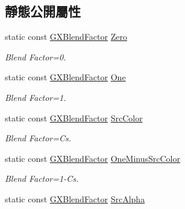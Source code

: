 \subsection*{靜態公開屬性}
\begin{DoxyCompactItemize}
\item 
static const \hyperlink{class_magnum_1_1_g_x_blend_factor}{G\+X\+Blend\+Factor} \hyperlink{class_magnum_1_1_g_x_blend_factor_a975e0d341a5a34242d5b96d5371dd747}{Zero}\hypertarget{class_magnum_1_1_g_x_blend_factor_a975e0d341a5a34242d5b96d5371dd747}{}\label{class_magnum_1_1_g_x_blend_factor_a975e0d341a5a34242d5b96d5371dd747}

\begin{DoxyCompactList}\small\item\em Blend Factor=0. \end{DoxyCompactList}\item 
static const \hyperlink{class_magnum_1_1_g_x_blend_factor}{G\+X\+Blend\+Factor} \hyperlink{class_magnum_1_1_g_x_blend_factor_a0d83c403b4aee7abdd97f3ff8c74b59b}{One}\hypertarget{class_magnum_1_1_g_x_blend_factor_a0d83c403b4aee7abdd97f3ff8c74b59b}{}\label{class_magnum_1_1_g_x_blend_factor_a0d83c403b4aee7abdd97f3ff8c74b59b}

\begin{DoxyCompactList}\small\item\em Blend Factor=1. \end{DoxyCompactList}\item 
static const \hyperlink{class_magnum_1_1_g_x_blend_factor}{G\+X\+Blend\+Factor} \hyperlink{class_magnum_1_1_g_x_blend_factor_a0fd76a24a6639b9df6d9a0b37f82334a}{Src\+Color}\hypertarget{class_magnum_1_1_g_x_blend_factor_a0fd76a24a6639b9df6d9a0b37f82334a}{}\label{class_magnum_1_1_g_x_blend_factor_a0fd76a24a6639b9df6d9a0b37f82334a}

\begin{DoxyCompactList}\small\item\em Blend Factor=Cs. \end{DoxyCompactList}\item 
static const \hyperlink{class_magnum_1_1_g_x_blend_factor}{G\+X\+Blend\+Factor} \hyperlink{class_magnum_1_1_g_x_blend_factor_a38ba7eeb2783422ea42c6441978a6c30}{One\+Minus\+Src\+Color}\hypertarget{class_magnum_1_1_g_x_blend_factor_a38ba7eeb2783422ea42c6441978a6c30}{}\label{class_magnum_1_1_g_x_blend_factor_a38ba7eeb2783422ea42c6441978a6c30}

\begin{DoxyCompactList}\small\item\em Blend Factor=1-\/\+Cs. \end{DoxyCompactList}\item 
static const \hyperlink{class_magnum_1_1_g_x_blend_factor}{G\+X\+Blend\+Factor} \hyperlink{class_magnum_1_1_g_x_blend_factor_a6c57870aa0d05bd567b8864985a0d2f0}{Src\+Alpha}\hypertarget{class_magnum_1_1_g_x_blend_factor_a6c57870aa0d05bd567b8864985a0d2f0}{}\label{class_magnum_1_1_g_x_blend_factor_a6c57870aa0d05bd567b8864985a0d2f0}


\end{DoxyCompactItemize}
